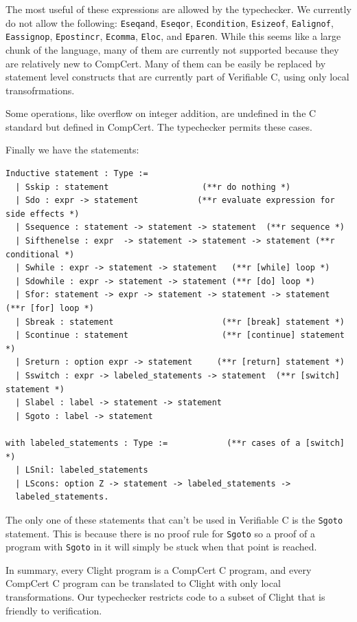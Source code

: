 \documentclass{puthesis}
\begin{document}
The most useful of these expressions are allowed by the typechecker. We
currently do not allow the following: \lstinline|Eseqand|,
\lstinline|Eseqor|, \lstinline|Econdition|, \lstinline|Esizeof|,
\lstinline|Ealignof|, \lstinline|Eassignop|, \lstinline|Epostincr|,
\lstinline|Ecomma|, \lstinline|Eloc|, and \lstinline|Eparen|. While
this seems like a large chunk of the language, many of them are
currently not supported because they are relatively new to
CompCert. Many of them can be easily be replaced by statement level
constructs that are currently part of Verifiable C, using only local
transofrmations.

Some operations, like overflow on integer addition, are undefined in
the C standard but defined in CompCert. The typechecker
permits these cases. 

Finally we have the statements:
\begin{singlespace}
\begin{lstlisting}
Inductive statement : Type :=
  | Sskip : statement                   (**r do nothing *)
  | Sdo : expr -> statement            (**r evaluate expression for side effects *)
  | Ssequence : statement -> statement -> statement  (**r sequence *)
  | Sifthenelse : expr  -> statement -> statement -> statement (**r conditional *)
  | Swhile : expr -> statement -> statement   (**r [while] loop *)
  | Sdowhile : expr -> statement -> statement (**r [do] loop *)
  | Sfor: statement -> expr -> statement -> statement -> statement (**r [for] loop *)
  | Sbreak : statement                      (**r [break] statement *)
  | Scontinue : statement                   (**r [continue] statement *)
  | Sreturn : option expr -> statement     (**r [return] statement *)
  | Sswitch : expr -> labeled_statements -> statement  (**r [switch] statement *)
  | Slabel : label -> statement -> statement
  | Sgoto : label -> statement

with labeled_statements : Type :=            (**r cases of a [switch] *)
  | LSnil: labeled_statements
  | LScons: option Z -> statement -> labeled_statements ->
  labeled_statements.
\end{lstlisting}
\end{singlespace}
The
only one of these statements that can't be used in Verifiable C is the
\lstinline|Sgoto| statement. This is because there is no proof rule
for \lstinline|Sgoto| so a proof of a program with \lstinline|Sgoto| in
it will simply be stuck when that point is reached. 

In summary, every Clight program is a CompCert C
program, and every CompCert C program can be translated to Clight with
only local transformations. Our typechecker restricts code to a
subset of Clight that is friendly to verification.
\end{document}
